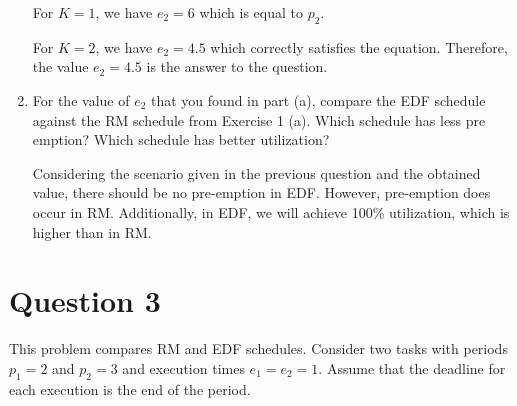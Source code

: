 \documentclass[12pt]{article}
\begin{document}
\begin{enumerate}
\begin{qsolve}
		For $K=1$, we have $e_2=6$ which is equal to $p_2$.
		
		For $K=2$, we have $e_2=4.5$ which correctly satisfies the equation. Therefore, the value $e_2=4.5$ is the answer to the question.
	\end{qsolve}
	
	
	\item 
	For the value of $e_2$ that you found in part (a), compare the EDF schedule
	against the RM schedule from Exercise 1 (a). Which schedule has less pre
	emption? Which schedule has better utilization?
	
	\begin{qsolve}
		Considering the scenario given in the previous question and the obtained value, there should be no pre-emption in EDF. However, pre-emption does occur in RM. Additionally, in EDF, we will achieve 100\% utilization, which is higher than in RM. 
	\end{qsolve}
\end{enumerate}
\vfil
\clearpage












\section{Question 3}
This problem compares RM and EDF schedules. Consider two tasks with periods
$p_1 = 2$ and $p_2 = 3$ and execution times $e_1 = e_2 = 1$. Assume that the deadline for
each execution is the end of the period.
\end{document}
